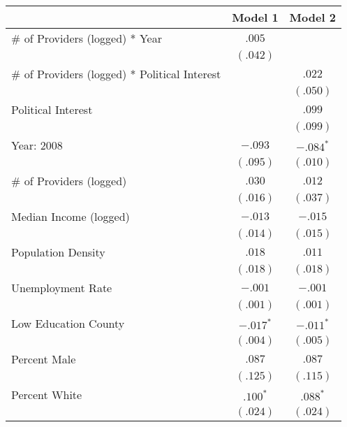 
\begin{tabular}{l c c}
\hline
 & Model 1 & Model 2 \\
\hline
\# of Providers (logged) * Year               & $.005$      &             \\
                                              & $(.042)$    &             \\
\# of Providers (logged) * Political Interest &             & $.022$      \\
                                              &             & $(.050)$    \\
Political Interest                            &             & $.099$      \\
                                              &             & $(.099)$    \\
Year: 2008                                    & $-.093$     & $-.084^{*}$ \\
                                              & $(.095)$    & $(.010)$    \\
\# of Providers (logged)                      & $.030$      & $.012$      \\
                                              & $(.016)$    & $(.037)$    \\
Median Income (logged)                        & $-.013$     & $-.015$     \\
                                              & $(.014)$    & $(.015)$    \\
Population Density                            & $.018$      & $.011$      \\
                                              & $(.018)$    & $(.018)$    \\
Unemployment Rate                             & $-.001$     & $-.001$     \\
                                              & $(.001)$    & $(.001)$    \\
Low Education County                          & $-.017^{*}$ & $-.011^{*}$ \\
                                              & $(.004)$    & $(.005)$    \\
Percent Male                                  & $.087$      & $.087$      \\
                                              & $(.125)$    & $(.115)$    \\
Percent White                                 & $.100^{*}$  & $.088^{*}$  \\
                                              & $(.024)$    & $(.024)$    \\

\end{tabular}
